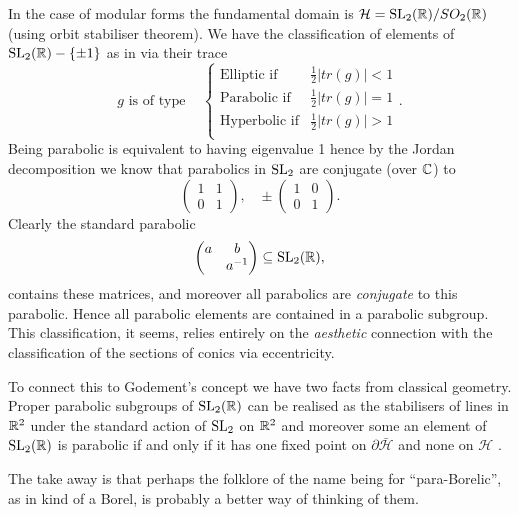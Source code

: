 \begin{Remark}
    In the case of modular forms the fundamental domain is \(\mathcal{H} = \SL_2(\R)/SO_2(\R)\) (using orbit stabiliser theorem). We have the classification of elements of  \(\SL_2(\R) -\{\pm 1\}\) as in \cite[3.5]{borelAutomorphicFormsSL21997} via their trace
    \[g\text{ is of type } \;\;\; 
    \begin{cases}
        \text{Elliptic if} & \frac{1}{2}|tr(g)| < 1 \\
        \text{Parabolic if} & \frac{1}{2}|tr(g)| = 1 \\
        \text{Hyperbolic if} & \frac{1}{2}|tr(g)| > 1 \\
    \end{cases}
    .\]
    Being parabolic is equivalent to having eigenvalue 1 hence by the Jordan decomposition we know that parabolics in \(\operatorname{SL}_2\) are conjugate (over \(\C\)) to 
    \[\begin{pmatrix}
        1 & 1\\
        0 & 1
    \end{pmatrix},\;\;\; \pm\begin{pmatrix}
        1 & 0\\
        0 & 1
    \end{pmatrix}.\]
    Clearly the standard parabolic 
    \[\begin{pmatrix}
        a & b \\
         & a\inv
    \end{pmatrix} \subseteq \SL_2(\R),\]
    contains these matrices, and moreover all parabolics are \textit{conjugate} to this parabolic. Hence all parabolic elements are contained in a parabolic subgroup. This classification, it seems, relies entirely on the \textit{aesthetic} connection with the classification of the sections of conics via eccentricity.

    To connect this to Godement's concept we have two facts from classical geometry. Proper parabolic subgroups of \(\SL_2(\R)\) can be realised as the stabilisers of lines in \(\R^2\) under the standard action of \(\operatorname{SL}_2\) on \(\R^2\) \cite[2.6]{borelAutomorphicFormsSL21997} and moreover some an element of \(\SL_2(\R)\) is parabolic if and only if it has one fixed point on \(\partial\bar{\mathcal{H}}\) and none on \(\mathcal{H}\) \cite[3.5]{borelAutomorphicFormsSL21997}. 

    The take away is that perhaps the folklore of the name being for ``para-Borelic'', as in kind of a Borel, is probably a better way of thinking of them.
\end{Remark}

